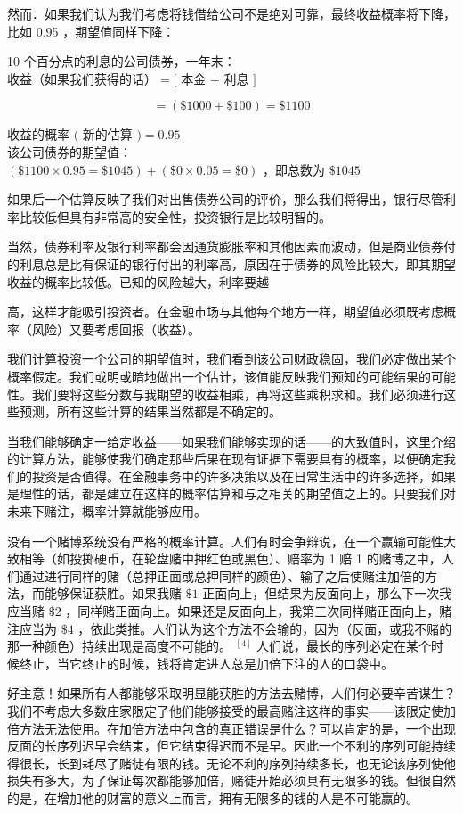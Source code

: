 然而．如果我们认为我们考虑将钱借给公司不是绝对可靠，最终收益概率将下降，比如 0.95 ，期望值同样下降：

10 个百分点的利息的公司债券，一年末：\\
收益（如果我们获得的话）$=[$ 本金 + 利息 $]$

$$
=(\$ 1000+\$ 100)=\$ 1100
$$

收益的概率 $($ 新的估算 $)=0.95$\\
该公司债券的期望值：\\
$(\$ 1100 \times 0.95=\$ 1045)+(\$ 0 \times 0.05=\$ 0)$ ，即总数为 $\$ 1045$

如果后一个估算反映了我们对出售债券公司的评价，那么我们将得出，银行尽管利率比较低但具有非常高的安全性，投资银行是比较明智的。

当然，债券利率及银行利率都会因通货膨胀率和其他因素而波动，但是商业债券付的利息总是比有保证的银行付出的利率高，原因在于债券的风险比较大，即其期望收益的概率比较低。已知的风险越大，利率要越

高，这样才能吸引投资者。在金融市场与其他每个地方一样，期望值必须既考虑概率（风险）又要考虑回报（收益）。

我们计算投资一个公司的期望值时，我们看到该公司财政稳固，我们必定做出某个概率假定。我们或明或暗地做出一个估计，该值能反映我们预知的可能结果的可能性。我们要将这些分数与我期望的收益相乘，再将这些乘积求和。我们必须进行这些预测，所有这些计算的结果当然都是不确定的。

当我们能够确定一给定收益——如果我们能够实现的话——的大致值时，这里介绍的计算方法，能够使我们确定那些后果在现有证据下需要具有的概率，以便确定我们的投资是否值得。在金融事务中的许多决策以及在日常生活中的许多选择，如果是理性的话，都是建立在这样的概率估算和与之相关的期望值之上的。只要我们对未来下赌注，概率计算就能够应用。

没有一个赌博系统没有严格的概率计算。人们有时会争辩说，在一个赢输可能性大致相等（如投掷硬币，在轮盘赌中押红色或黑色）、赔率为 1 赔 1 的赌博之中，人们通过进行同样的赌（总押正面或总押同样的颜色）、输了之后使赌注加倍的方法，而能够保证获胜。如果我赌 $\$ 1$ 正面向上，但结果为反面向上，那么下一次我应当赌 $\$ 2$ ，同样赌正面向上。如果还是反面向上，我第三次同样赌正面向上，赌注应当为 $\$ 4$ ，依此类推。人们认为这个方法不会输的，因为（反面，或我不赌的那一种颜色）持续出现是高度不可能的。 ${ }^{[4]}$ 人们说，最长的序列必定在某个时候终止，当它终止的时候，钱将肯定进人总是加倍下注的人的口袋中。

好主意！如果所有人都能够采取明显能获胜的方法去赌博，人们何必要辛苦谋生？我们不考虑大多数庄家限定了他们能够接受的最高赌注这样的事实——该限定使加倍方法无法使用。在加倍方法中包含的真正错误是什么？可以肯定的是，一个出现反面的长序列迟早会结束，但它结束得迟而不是早。因此一个不利的序列可能持续得很长，长到耗尽了赌徒有限的钱。无论不利的序列持续多长，也无论该序列使他损失有多大，为了保证每次都能够加倍，赌徒开始必须具有无限多的钱。但很自然的是，在增加他的财富的意义上而言，拥有无限多的钱的人是不可能赢的。

